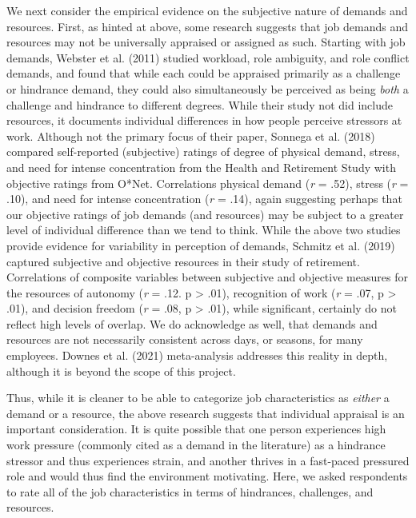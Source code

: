 \documentclass[
  man]{apa6}
\begin{document}
We next consider the empirical evidence on the subjective nature of demands and resources. First, as hinted at above, some research suggests that job demands and resources may not be universally appraised or assigned as such. Starting with job demands, Webster et al. (2011) studied workload, role ambiguity, and role conflict demands, and found that while each could be appraised primarily as a challenge or hindrance demand, they could also simultaneously be perceived as being \emph{both} a challenge and hindrance to different degrees. While their study not did include resources, it documents individual differences in how people perceive stressors at work. Although not the primary focus of their paper, Sonnega et al. (2018) compared self-reported (subjective) ratings of degree of physical demand, stress, and need for intense concentration from the Health and Retirement Study with objective ratings from O*Net. Correlations physical demand (\emph{r} = .52), stress (\emph{r} = .10), and need for intense concentration (\emph{r} = .14), again suggesting perhaps that our objective ratings of job demands (and resources) may be subject to a greater level of individual difference than we tend to think. While the above two studies provide evidence for variability in perception of demands, Schmitz et al. (2019) captured subjective and objective resources in their study of retirement. Correlations of composite variables between subjective and objective measures for the resources of autonomy (\emph{r} = .12. p \textgreater{} .01), recognition of work (\emph{r} = .07, p \textgreater{} .01), and decision freedom (\emph{r} = .08, p \textgreater{} .01), while significant, certainly do not reflect high levels of overlap. We do acknowledge as well, that demands and resources are not necessarily consistent across days, or seasons, for many employees. Downes et al. (2021) meta-analysis addresses this reality in depth, although it is beyond the scope of this project.

Thus, while it is cleaner to be able to categorize job characteristics as \emph{either} a demand or a resource, the above research suggests that individual appraisal is an important consideration. It is quite possible that one person experiences high work pressure (commonly cited as a demand in the literature) as a hindrance stressor and thus experiences strain, and another thrives in a fast-paced pressured role and would thus find the environment motivating. Here, we asked respondents to rate all of the job characteristics in terms of hindrances, challenges, and resources.
\end{document}
